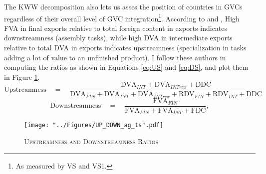 \documentclass[a4paper]{article}
\begin{document}
The KWW decomposition also lets us asses the position of countries in GVCs regardless of their overall level of GVC integration\footnote{As measured by VS and VS1.}. According to \citet{Kummritz20162} and \citet{wang2013quantifying}, High FVA in final exports relative to total foreign content in exports indicates downstreamness (assembly tasks), while high DVA in intermediate exports relative to total DVA in exports indicates upstreamness (specialization in tasks adding a lot of value to an unfinished product). I follow these authors in computing the ratios as shown in Equations \ref{eq:US} and \ref{eq:DS}, and plot them in Figure \ref{fig:UP_DOWN_ag_ts}.  
\begin{equation} \label{eq:US}
\text{Upstreamness}\quad =\quad \frac{\text{DVA}_{INT} + \text{DVA}_{INTrex} + \text{DDC}}{\text{DVA}_{FIN} + \text{DVA}_{INT} + \text{DVA}_{INTrex} + \text{RDV}_{FIN} + \text{RDV}_{INT} + \text{DDC}}
\end{equation}
\begin{equation} \label{eq:DS}
\text{Downstreamness}\quad =\quad \frac{\text{FVA}_{FIN}}{\text{FVA}_{FIN} + \text{FVA}_{INT} + \text{FDC}},
\end{equation}
\begin{figure}[h!] \vspace{-0.3cm}
\centering
\caption{\label{fig:UP_DOWN_ag_ts}\textsc{Upstreamness and Downstreamness Ratios}}
\texttt{[image: "../Figures/UP\_DOWN\_ag\_ts".pdf]} %
\end{figure} 
\FloatBarrier 
\end{document}
